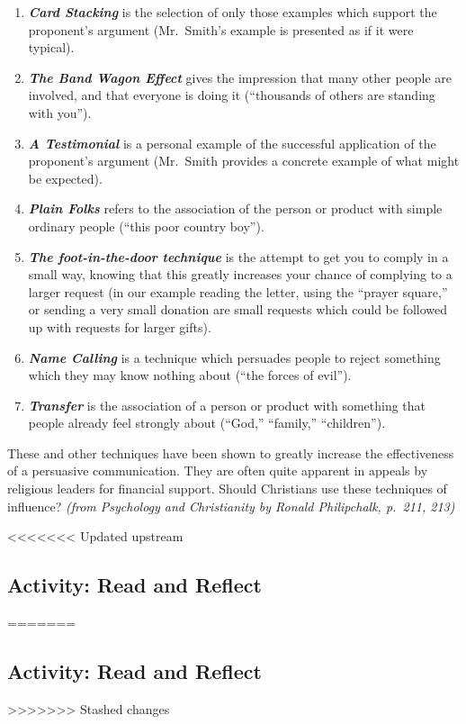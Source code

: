 \documentclass[
]{book}
\providecommand{\tightlist}{%
  \setlength{\itemsep}{0pt}\setlength{\parskip}{0pt}}
\begin{document}
\begin{enumerate}
\def\labelenumi{\arabic{enumi}.}
\tightlist
\item
  \textbf{\emph{Card Stacking}} is the selection of only those examples which support the proponent's argument (Mr.~Smith's example is presented as if it were typical).\\
\item
  \textbf{\emph{The Band Wagon Effect}} gives the impression that many other people are involved, and that everyone is doing it (``thousands of others are standing with you'').\\
\item
  \textbf{\emph{A Testimonial}} is a personal example of the successful application of the proponent's argument (Mr.~Smith provides a concrete example of what might be expected).\\
\item
  \textbf{\emph{Plain Folks}} refers to the association of the person or product with simple ordinary people (``this poor country boy'').\\
\item
  \textbf{\emph{The foot-in-the-door technique}} is the attempt to get you to comply in a small way, knowing that this greatly increases your chance of complying to a larger request (in our example reading the letter, using the ``prayer square,'' or sending a very small donation are small requests which could be followed up with requests for larger gifts).\\
\item
  \textbf{\emph{Name Calling}} is a technique which persuades people to reject something which they may know nothing about (``the forces of evil'').\\
\item
  \textbf{\emph{Transfer}} is the association of a person or product with something that people already feel strongly about (``God,'' ``family,'' ``children'').
\end{enumerate}

These and other techniques have been shown to greatly increase the effectiveness of a persuasive communication. They are often quite apparent in appeals by religious leaders for financial support. Should Christians use these techniques of influence? \emph{(from Psychology and Christianity by Ronald Philipchalk, p.~211, 213)}

<<<<<<< Updated upstream
\hypertarget{activity-read-and-reflect-8}{%
\subsection*{Activity: Read and Reflect}\label{activity-read-and-reflect-8}}
=======
\hypertarget{activity-read-and-reflect-7}{%
\subsection*{Activity: Read and Reflect}\label{activity-read-and-reflect-7}}
>>>>>>> Stashed changes
\end{document}
